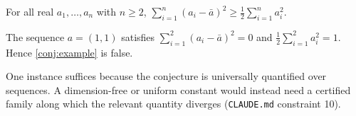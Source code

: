 \documentclass[../../main.tex]{subfiles}
\begin{document}
\begin{conjecture}
\label{conj:example}
  For all real $a_1,\dots,a_n$ with $n \ge 2$,
  $\sum_{i=1}^n (a_i - \bar a)^2 \ge \tfrac{1}{2}\sum_{i=1}^n a_i^2$.
\end{conjecture}

\begin{proposition}
\label{prop:example-refuter}
  The sequence $a = (1,1)$ satisfies $\sum_{i=1}^2 (a_i - \bar a)^2 = 0$ and
  $\tfrac{1}{2}\sum_{i=1}^2 a_i^2 = 1$. Hence \ref{conj:example} is false.
\end{proposition}

One instance suffices because the conjecture is universally quantified over
sequences. A dimension-free or uniform constant would instead need a certified
family along which the relevant quantity diverges (\texttt{CLAUDE.md}
constraint 10).
\end{document}

